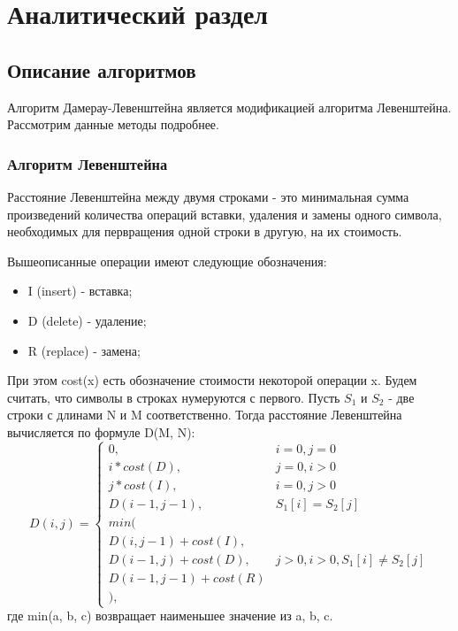 \chapter{Аналитический раздел}
\label{cha:analysis}

\section{Описание алгоритмов}

Алгоритм Дамерау-Левенштейна является модификацией алгоритма Левенштейна. Рассмотрим данные методы подробнее.

\subsection{Алгоритм Левенштейна}

Расстояние Левенштейна между двумя строками - это минимальная сумма произведений количества операций вставки, удаления и замены одного символа, необходимых для первращения одной строки в другую, на их стоимость.

Вышеописанные операции имеют следующие обозначения:
\begin{itemize}
    \item I (insert) - вставка;
    \item D (delete) - удаление;
    \item R (replace) - замена;
\end{itemize}

При этом cost(x) есть обозначение стоимости некоторой операции x. Будем считать, что символы в строках нумеруются с первого. Пусть $S_{1}$ и $S_{2}$ - две строки с длинами N и M соответственно. Тогда расстояние Левенштейна вычисляется по формуле D(M, N):
\begin{equation}
D(i,j) = \left\{ \begin{array}{ll}
 0, & \textrm{$i = 0, j = 0$}\\
 i * cost(D), & \textrm{$j = 0, i > 0$}\\
 j * cost(I), & \textrm{$i = 0, j > 0$}\\
 D(i - 1, j - 1), & \textrm{$S_{1}[i] = S_{2}[j]$}\\
min(\\
D(i,j-1) + cost(I),\\
D(i-1, j) + cost(D), &\textrm{$j > 0, i > 0, S_1[i] \neq S_2[j]$}\\
D(i-1, j-1) + cost(R)\\
),
  \end{array} \right.
\end{equation}
где min(a, b, c) возвращает наименьшее значение из a, b, c.

